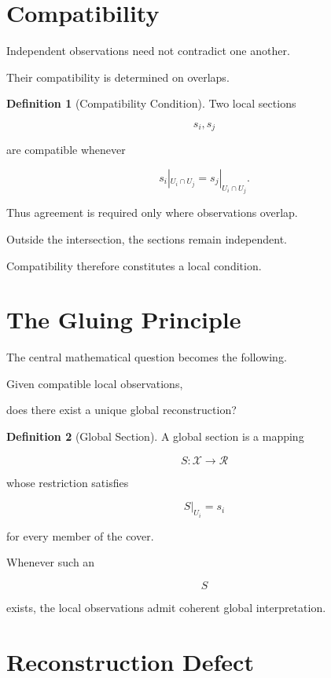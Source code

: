 \documentclass[11pt,oneside]{book}
\numberwithin{equation}{chapter}
\theoremstyle{definition}
\newtheorem{definition}{Definition}[chapter]
\theoremstyle{plain}
\begin{document}
\section{Compatibility}

Independent observations need not contradict one another.

Their compatibility is determined on overlaps.

\begin{definition}[Compatibility Condition]

Two local sections

\[
s_i,
s_j
\]

are compatible whenever

\[
s_i|_{U_i\cap U_j}
=
s_j|_{U_i\cap U_j}.
\]

\end{definition}

Thus agreement is required only where observations overlap.

Outside the intersection, the sections remain independent.

Compatibility therefore constitutes a local condition.

\section{The Gluing Principle}

The central mathematical question becomes the following.

Given compatible local observations,

does there exist a unique global reconstruction?

\begin{definition}[Global Section]

A global section is a mapping

\[
S
:
\mathcal{X}
\rightarrow
\mathcal{R}
\]

whose restriction satisfies

\[
S|_{U_i}
=
s_i
\]

for every member of the cover.

\end{definition}

Whenever such an

\[
S
\]

exists, the local observations admit coherent global interpretation.

\section{Reconstruction Defect}
\end{document}
